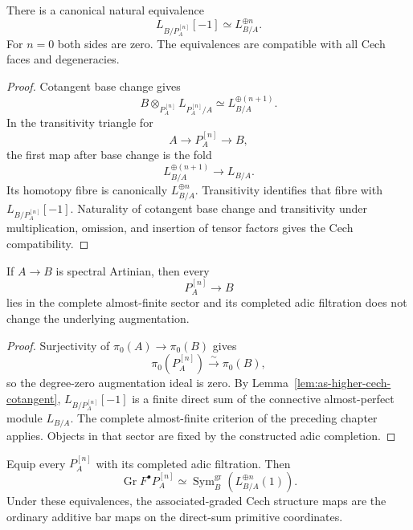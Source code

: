 \begin{lemma}
\label{lem:as-higher-cech-cotangent}
There is a canonical natural equivalence
\[
\boxed{
    L_{B/P_A^{[n]}}[-1]
    \simeq
    L_{B/A}^{\oplus n}.
}
\]
For $n=0$ both sides are zero.  The equivalences are compatible with all Cech
faces and degeneracies.
\end{lemma}

\begin{proof}
Cotangent base change gives
\[
    B\otimes_{P_A^{[n]}}
    L_{P_A^{[n]}/A}
    \simeq
    L_{B/A}^{\oplus(n+1)}.
\]
In the transitivity triangle for
\[
    A\longrightarrow P_A^{[n]}\longrightarrow B,
\]
the first map after base change is the fold
\[
    L_{B/A}^{\oplus(n+1)}
    \longrightarrow
    L_{B/A}.
\]
Its homotopy fibre is canonically
$L_{B/A}^{\oplus n}$.  Transitivity identifies that fibre with
$L_{B/P_A^{[n]}}[-1]$.  Naturality of cotangent base change and transitivity
under multiplication, omission, and insertion of tensor factors gives the
Cech compatibility.
\end{proof}

\begin{lemma}
\label{lem:as-higher-cech-complete-aft}
If $A\to B$ is spectral Artinian, then every
\[
    P_A^{[n]}\longrightarrow B
\]
lies in the complete almost-finite sector and its completed adic filtration
does not change the underlying augmentation.
\end{lemma}

\begin{proof}
Surjectivity of $\pi_0(A)\to\pi_0(B)$ gives
\[
    \pi_0(P_A^{[n]})
    \xrightarrow{\sim}
    \pi_0(B),
\]
so the degree-zero augmentation ideal is zero.  By
Lemma~\ref{lem:as-higher-cech-cotangent},
$L_{B/P_A^{[n]}}[-1]$ is a finite direct sum of the connective
almost-perfect module $L_{B/A}$.  The complete almost-finite criterion of the
preceding chapter applies.  Objects in that sector are fixed by the
constructed adic completion.
\end{proof}

\begin{proposition}
\label{prop:as-higher-cech-associated-graded}
Equip every $P_A^{[n]}$ with its completed adic filtration.  Then
\[
\boxed{
    \operatorname{Gr}
    F^\bullet P_A^{[n]}
    \simeq
    \operatorname{Sym}^{\mathrm{gr}}_B
    \left(
        L_{B/A}^{\oplus n}(1)
    \right).
}
\]
Under these equivalences, the associated-graded Cech structure maps are the
ordinary additive bar maps on the direct-sum primitive coordinates.
\end{proposition}

